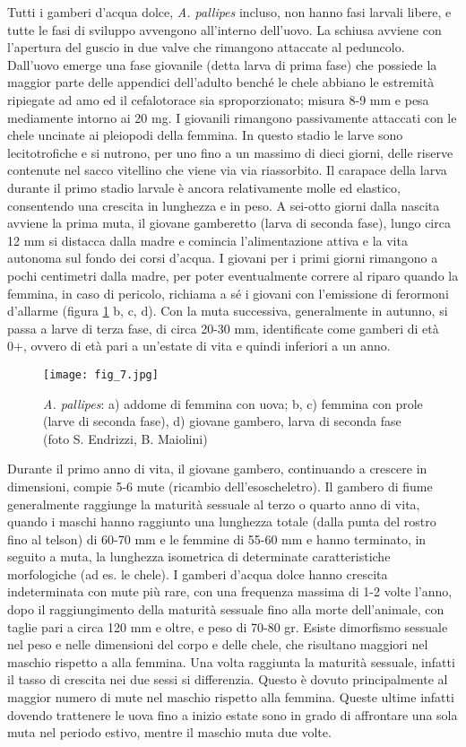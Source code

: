 \documentclass[11pt,a4paper,italian,twoside,openany]{memoir}
\begin{document}
Tutti i gamberi d'acqua dolce, \emph{A. pallipes} incluso, non hanno fasi larvali libere, e tutte le fasi di sviluppo avvengono all'interno dell'uovo. La schiusa avviene con l'apertura del guscio in due valve che rimangono attaccate al peduncolo. Dall'uovo emerge una fase giovanile (detta larva di prima fase) che possiede la maggior parte delle appendici dell'adulto benché le chele abbiano le estremità ripiegate ad amo ed il cefalotorace sia sproporzionato; misura 8-9 mm e pesa mediamente intorno ai 20 mg. I giovanili rimangono passivamente attaccati con le chele uncinate ai pleiopodi della femmina. In questo stadio le larve sono lecitotrofiche e si nutrono, per uno fino a un massimo di dieci giorni, delle riserve contenute nel sacco vitellino che viene via via riassorbito. Il carapace della larva durante il primo stadio larvale è ancora relativamente molle ed elastico, consentendo una crescita in lunghezza e in peso. A sei-otto giorni dalla nascita avviene la prima muta, il giovane gamberetto (larva di seconda fase), lungo circa 12 mm si distacca dalla madre e comincia l'alimentazione attiva e la vita autonoma sul fondo dei corsi d'acqua. I giovani per i primi giorni rimangono a pochi centimetri dalla madre, per poter eventualmente correre al riparo quando la femmina, in caso di pericolo, richiama a sé i giovani con l'emissione di ferormoni d'allarme (figura \ref{fig_7} b, c, d). Con la muta successiva, generalmente in autunno, si passa a larve di terza fase, di circa 20-30 mm, identificate come gamberi di età 0+, ovvero di età pari a un'estate di vita e quindi inferiori a un anno. 

\begin{figure}
  \centering
  \texttt{[image: fig\_7.jpg]}
  \caption{\emph{A. pallipes}: a) addome di femmina con uova; b, c) femmina con prole (larve di seconda fase), d) giovane gambero, larva di seconda fase (foto S. Endrizzi, B. Maiolini)}
  \label{fig_7}
\end{figure}

Durante il primo anno di vita, il giovane gambero, continuando a crescere in dimensioni, compie 5-6 mute (ricambio dell'esoscheletro). Il gambero di fiume generalmente raggiunge la maturità sessuale al terzo o quarto anno di vita, quando i maschi hanno raggiunto una lunghezza totale (dalla punta del rostro fino al telson) di 60-70 mm e le femmine di 55-60 mm e hanno terminato, in seguito a muta, la lunghezza isometrica di determinate caratteristiche morfologiche (ad es. le chele). I gamberi d'acqua dolce hanno crescita indeterminata con mute più rare, con una frequenza massima di 1-2 volte l'anno, dopo il raggiungimento della maturità sessuale fino alla morte dell'animale, con taglie pari a circa 120 mm e oltre, e peso di 70-80 gr. Esiste dimorfismo sessuale nel peso e nelle dimensioni del corpo e delle chele, che risultano maggiori nel maschio rispetto a alla femmina. Una volta raggiunta la maturità sessuale, infatti il tasso di crescita nei due sessi si differenzia. Questo è dovuto principalmente al maggior numero di mute nel maschio rispetto alla femmina. Queste ultime infatti dovendo trattenere le uova fino a inizio estate sono in grado di affrontare una sola muta nel periodo estivo, mentre il maschio muta due volte.
\end{document}
